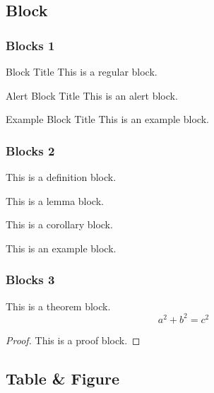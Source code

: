 \documentclass[compress,aspectratio=43]{beamer}
\begin{document}
\subsection{Block}

\begin{frame}
    \frametitle{Blocks 1}
    \begin{block}{Block Title}
        This is a regular block.
    \end{block}

    \begin{alertblock}{Alert Block Title}
        This is an alert block.
    \end{alertblock}

    \begin{exampleblock}{Example Block Title}
        This is an example block.
    \end{exampleblock}
\end{frame}

\begin{frame}
    \frametitle{Blocks 2}
    \begin{definition}[XXX]
        This is a definition block.
    \end{definition}

    \begin{lemma}[XXX]
        This is a lemma block.
    \end{lemma}

    \begin{corollary}[XXX]
        This is a corollary block.
    \end{corollary}

    \begin{example}[XXX]
        This is an example block.
    \end{example}

\end{frame}

\begin{frame}
    \frametitle{Blocks 3}
    \begin{theorem}[XXX]
        This is a theorem block.
        \[
            a^2 + b^2 = c^2
        \]
    \end{theorem}

    \begin{proof}
        This is a proof block.
    \end{proof}

\end{frame}

\subsection{Table \& Figure}
\end{document}
